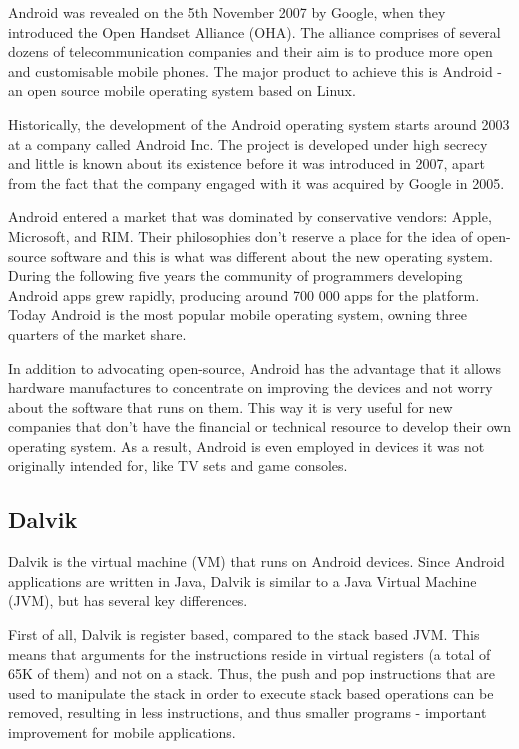 \documentclass[parskip]{cs4rep}
\begin{document}
Android was revealed on the 5th November 2007 by Google, when they introduced the Open Handset Alliance (OHA)\cite{DeLacey2007}. The alliance comprises of several dozens of telecommunication companies and their aim is to produce more open and customisable mobile phones. The major product to achieve this is Android - an open source mobile operating system based on Linux.

Historically, the development of the Android operating system starts around 2003 at a company called Android Inc\cite{BloombergBusinessweek2005}. The project is developed under high secrecy and little is known about its existence before it was introduced in 2007, apart from the fact that the company engaged with it was acquired by Google in 2005.

Android entered a market that was dominated by conservative vendors: Apple, Microsoft, and RIM. Their philosophies don't reserve a place for the idea of open-source software and this is what was different about the new operating system. During the following five years the community of programmers developing Android apps grew rapidly, producing around 700 000 apps for the platform\cite{Islam2012}. Today Android is the most popular mobile operating system, owning three quarters of the market share\cite{IDC2012}.

In addition to advocating open-source, Android has the advantage that it allows hardware manufactures to concentrate on improving the devices and not worry about the software that runs on them. This way it is very useful for new companies that don't have the financial or technical resource to develop their own operating system. As a result, Android is even employed in devices it was not originally intended for, like TV sets and game consoles\cite{Telecompaper2012}\cite{Etherington2013}.

\subsection{Dalvik}

Dalvik is the virtual machine (VM) that runs on Android devices. Since Android applications are written in Java, Dalvik is similar to a Java Virtual Machine (JVM), but has several key differences.

First of all, Dalvik is register based, compared to the stack based JVM. This means that arguments for the instructions reside in virtual registers (a total of 65K of them) and not on a stack. Thus, the push and pop instructions that are used to manipulate the stack in order to execute stack based operations can be removed, resulting in less instructions, and thus smaller programs - important improvement for mobile applications.
\end{document}
